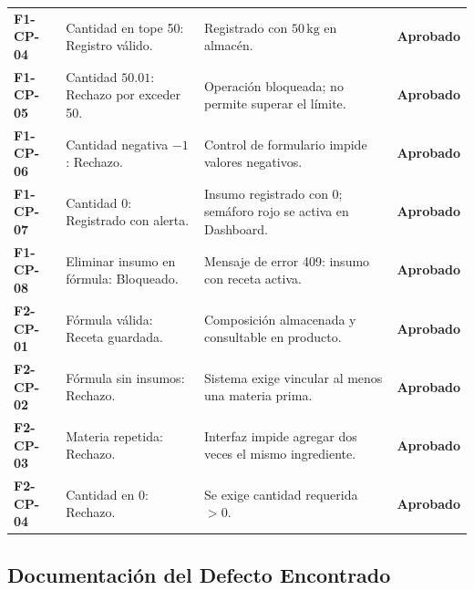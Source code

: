 \documentclass[11pt,a4paper]{article}
\begin{document}
\begin{longtable}{p{1.6cm} p{3.4cm} p{7.8cm} p{2.2cm}}
\textbf{F1-CP-04} & Cantidad en tope 50: Registro válido. & Registrado con $50\,\text{kg}$ en almacén. & \textbf{\textcolor{accentgreen}{Aprobado}} \\
\textbf{F1-CP-05} & Cantidad $50.01$: Rechazo por exceder 50. & Operación bloqueada; no permite superar el límite. & \textbf{\textcolor{accentgreen}{Aprobado}} \\
\textbf{F1-CP-06} & Cantidad negativa $-1$: Rechazo. & Control de formulario impide valores negativos. & \textbf{\textcolor{accentgreen}{Aprobado}} \\
\textbf{F1-CP-07} & Cantidad 0: Registrado con alerta. & Insumo registrado con 0; semáforo rojo se activa en Dashboard. & \textbf{\textcolor{accentgreen}{Aprobado}} \\
\textbf{F1-CP-08} & Eliminar insumo en fórmula: Bloqueado. & Mensaje de error 409: insumo con receta activa. & \textbf{\textcolor{accentgreen}{Aprobado}} \\
\textbf{F2-CP-01} & Fórmula válida: Receta guardada. & Composición almacenada y consultable en producto. & \textbf{\textcolor{accentgreen}{Aprobado}} \\
\textbf{F2-CP-02} & Fórmula sin insumos: Rechazo. & Sistema exige vincular al menos una materia prima. & \textbf{\textcolor{accentgreen}{Aprobado}} \\
\textbf{F2-CP-03} & Materia repetida: Rechazo. & Interfaz impide agregar dos veces el mismo ingrediente. & \textbf{\textcolor{accentgreen}{Aprobado}} \\
\textbf{F2-CP-04} & Cantidad en 0: Rechazo. & Se exige cantidad requerida $>0$. & \textbf{\textcolor{accentgreen}{Aprobado}} \\
\end{longtable}

\subsection{Documentación del Defecto Encontrado}
\end{document}
